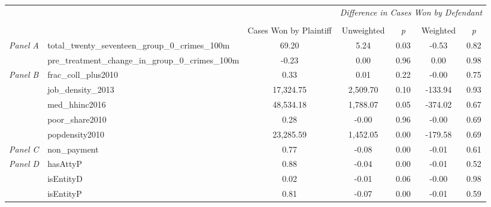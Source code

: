 \begin{tabular}{llccccc}
\toprule
 &  & \textit{} & \multicolumn{4}{c}{\textit{Difference in Cases Won by Defendant}} \\
\cline{4-7}
\\
 &  & Cases Won by Plaintiff & Unweighted & \emph{p} & Weighted & \emph{p} \\
\midrule
\multirow[c]{2}{3cm}{\textit{Panel A}} & total_twenty_seventeen_group_0_crimes_100m & 69.20 & 5.24 & 0.03 & -0.53 & 0.82 \\
 & pre_treatment_change_in_group_0_crimes_100m & -0.23 & 0.00 & 0.96 & 0.00 & 0.98 \\
\cline{1-7}
\multirow[c]{5}{3cm}{\textit{Panel B}} & frac_coll_plus2010 & 0.33 & 0.01 & 0.22 & -0.00 & 0.75 \\
 & job_density_2013 & 17,324.75 & 2,509.70 & 0.10 & -133.94 & 0.93 \\
 & med_hhinc2016 & 48,534.18 & 1,788.07 & 0.05 & -374.02 & 0.67 \\
 & poor_share2010 & 0.28 & -0.00 & 0.96 & -0.00 & 0.69 \\
 & popdensity2010 & 23,285.59 & 1,452.05 & 0.00 & -179.58 & 0.69 \\
\cline{1-7}
\textit{Panel C} & non_payment & 0.77 & -0.08 & 0.00 & -0.01 & 0.61 \\
\cline{1-7}
\multirow[c]{3}{3cm}{\textit{Panel D}} & hasAttyP & 0.88 & -0.04 & 0.00 & -0.01 & 0.52 \\
 & isEntityD & 0.02 & -0.01 & 0.06 & -0.00 & 0.98 \\
 & isEntityP & 0.81 & -0.07 & 0.00 & -0.01 & 0.59 \\
\cline{1-7}
\bottomrule
\end{tabular}
